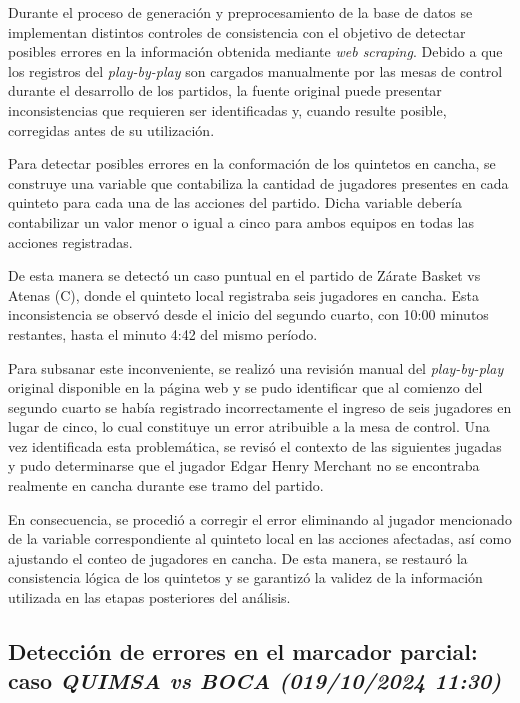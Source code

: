 \documentclass[
  12pt,
]{article}
\begin{document}
Durante el proceso de generación y preprocesamiento de la base de datos
se implementan distintos controles de consistencia con el objetivo de
detectar posibles errores en la información obtenida mediante \emph{web
scraping}. Debido a que los registros del \emph{play-by-play} son
cargados manualmente por las mesas de control durante el desarrollo de
los partidos, la fuente original puede presentar inconsistencias que
requieren ser identificadas y, cuando resulte posible, corregidas antes
de su utilización.

Para detectar posibles errores en la conformación de los quintetos en
cancha, se construye una variable que contabiliza la cantidad de
jugadores presentes en cada quinteto para cada una de las acciones del
partido. Dicha variable debería contabilizar un valor menor o igual a
cinco para ambos equipos en todas las acciones registradas.

De esta manera se detectó un caso puntual en el partido de Zárate Basket
vs Atenas (C), donde el quinteto local registraba seis jugadores en
cancha. Esta inconsistencia se observó desde el inicio del segundo
cuarto, con 10:00 minutos restantes, hasta el minuto 4:42 del mismo
período.

Para subsanar este inconveniente, se realizó una revisión manual del
\emph{play-by-play} original disponible en la página web y se pudo
identificar que al comienzo del segundo cuarto se había registrado
incorrectamente el ingreso de seis jugadores en lugar de cinco, lo cual
constituye un error atribuible a la mesa de control. Una vez
identificada esta problemática, se revisó el contexto de las siguientes
jugadas y pudo determinarse que el jugador Edgar Henry Merchant no se
encontraba realmente en cancha durante ese tramo del partido.

En consecuencia, se procedió a corregir el error eliminando al jugador
mencionado de la variable correspondiente al quinteto local en las
acciones afectadas, así como ajustando el conteo de jugadores en cancha.
De esta manera, se restauró la consistencia lógica de los quintetos y se
garantizó la validez de la información utilizada en las etapas
posteriores del análisis.

\subsection{\texorpdfstring{Detección de errores en el marcador parcial:
caso \emph{QUIMSA vs BOCA (019/10/2024
11:30)}}{Detección de errores en el marcador parcial: caso QUIMSA vs BOCA (019/10/2024 11:30)}}\label{detecciuxf3n-de-errores-en-el-marcador-parcial-caso-quimsa-vs-boca-019102024-1130}
\end{document}
